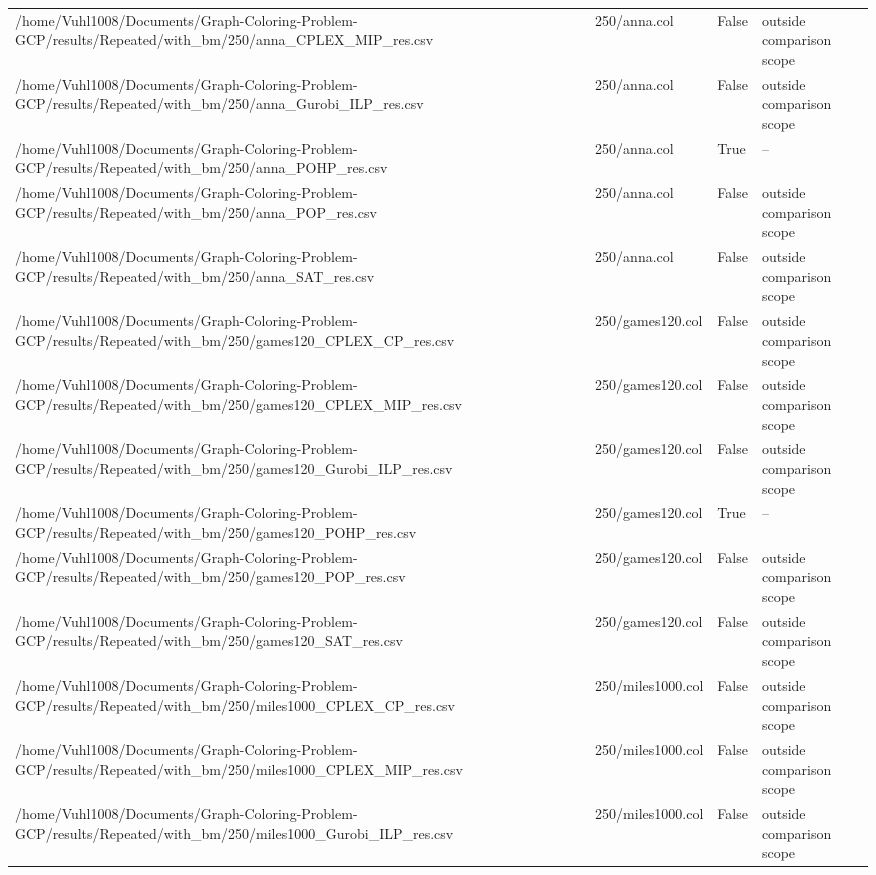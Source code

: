 \begin{table}[htbp]
\begin{tabular}{llll}
/home/Vuhl1008/Documents/Graph-Coloring-Problem-GCP/results/Repeated/with\_bm/250/anna\_CPLEX\_MIP\_res.csv & 250/anna.col & False & outside comparison scope \\
/home/Vuhl1008/Documents/Graph-Coloring-Problem-GCP/results/Repeated/with\_bm/250/anna\_Gurobi\_ILP\_res.csv & 250/anna.col & False & outside comparison scope \\
/home/Vuhl1008/Documents/Graph-Coloring-Problem-GCP/results/Repeated/with\_bm/250/anna\_POHP\_res.csv & 250/anna.col & True & -- \\
/home/Vuhl1008/Documents/Graph-Coloring-Problem-GCP/results/Repeated/with\_bm/250/anna\_POP\_res.csv & 250/anna.col & False & outside comparison scope \\
/home/Vuhl1008/Documents/Graph-Coloring-Problem-GCP/results/Repeated/with\_bm/250/anna\_SAT\_res.csv & 250/anna.col & False & outside comparison scope \\
/home/Vuhl1008/Documents/Graph-Coloring-Problem-GCP/results/Repeated/with\_bm/250/games120\_CPLEX\_CP\_res.csv & 250/games120.col & False & outside comparison scope \\
/home/Vuhl1008/Documents/Graph-Coloring-Problem-GCP/results/Repeated/with\_bm/250/games120\_CPLEX\_MIP\_res.csv & 250/games120.col & False & outside comparison scope \\
/home/Vuhl1008/Documents/Graph-Coloring-Problem-GCP/results/Repeated/with\_bm/250/games120\_Gurobi\_ILP\_res.csv & 250/games120.col & False & outside comparison scope \\
/home/Vuhl1008/Documents/Graph-Coloring-Problem-GCP/results/Repeated/with\_bm/250/games120\_POHP\_res.csv & 250/games120.col & True & -- \\
/home/Vuhl1008/Documents/Graph-Coloring-Problem-GCP/results/Repeated/with\_bm/250/games120\_POP\_res.csv & 250/games120.col & False & outside comparison scope \\
/home/Vuhl1008/Documents/Graph-Coloring-Problem-GCP/results/Repeated/with\_bm/250/games120\_SAT\_res.csv & 250/games120.col & False & outside comparison scope \\
/home/Vuhl1008/Documents/Graph-Coloring-Problem-GCP/results/Repeated/with\_bm/250/miles1000\_CPLEX\_CP\_res.csv & 250/miles1000.col & False & outside comparison scope \\
/home/Vuhl1008/Documents/Graph-Coloring-Problem-GCP/results/Repeated/with\_bm/250/miles1000\_CPLEX\_MIP\_res.csv & 250/miles1000.col & False & outside comparison scope \\
/home/Vuhl1008/Documents/Graph-Coloring-Problem-GCP/results/Repeated/with\_bm/250/miles1000\_Gurobi\_ILP\_res.csv & 250/miles1000.col & False & outside comparison scope \\

\end{tabular}
\end{table}
